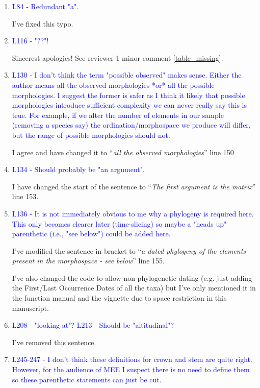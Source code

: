 \documentclass[12pt,letterpaper]{article}
\begin{document}
\begin{enumerate}
\item{\textcolor{blue}{L84 - Redundant "a".}}

I've fixed this typo.

\item{\textcolor{blue}{L116 - "??"!}}

Sincerest apologies! See reviewer 1 minor comment \ref{table_missing}.

\item{\textcolor{blue}{L130 - I don't think the term "possible observed" makes sense. Either the author means all the observed morphologies *or* all the possible morphologies. I suggest the former is safer as I think it likely that possible morphologies introduce sufficient complexity we can never really say this is true. For example, if we alter the number of elements in our sample (removing a species say) the ordination/morphospace we produce will differ, but the range of possible morphologies should not.}}

I agree and have changed it to ``\textit{all the observed morphologies}'' line 150

\item{\textcolor{blue}{L134 - Should probably be "an argument".}}

I have changed the start of the sentence to ``\textit{The first argument is the matrix}'' line 153.

\item{\textcolor{blue}{L136 - It is not immediately obvious to me why a phylogeny is required here. This only becomes clearer later (time-slicing) so maybe a "heads up" parenthetic (i.e., "see below") could be added here.}}

I've modified the sentence in bracket to
``\textit{a dated phylogeny of the elements present in the morphospace - see below}'' line 155.

I've also changed the code to allow non-phylogenetic dating (e.g. just adding the First/Last Occurrence Dates of all the taxa) but I've only mentioned it in the function manual and the vignette due to space restriction in this manuscript.

\item{\textcolor{blue}{L208 - "looking at"? L213 - Should be "altitudinal"?}}
\label{altitude}

I've removed this sentence.

\item{\textcolor{blue}{L245-247 - I don't think these definitions for crown and stem are quite right. However, for the audience of MEE I suspect there is no need to define them so these parenthetic statements can just be cut.}}


\end{enumerate}
\end{document}
